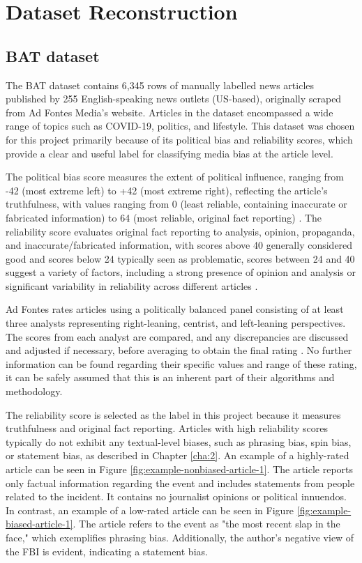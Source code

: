 \chapter{Dataset Reconstruction}
\label{cha:3}

\section{BAT dataset} \label{bat-characteristics}

The BAT dataset \cite{spinde-2023-bat} contains 6,345 rows of manually labelled news articles published by 255 English-speaking news outlets (US-based), originally scraped from Ad Fontes Media's website. Articles in the dataset encompassed a wide range of topics such as COVID-19, politics, and lifestyle. This dataset was chosen for this project primarily because of its political bias and reliability scores, which provide a clear and useful label for classifying media bias at the article level.

The political bias score measures the extent of political influence, ranging from -42 (most extreme left) to +42 (most extreme right), reflecting the article's truthfulness, with values ranging from 0 (least reliable, containing inaccurate or fabricated information) to 64 (most reliable, original fact reporting) \cite{adfontes-bias-reliability}. The reliability score evaluates original fact reporting to analysis, opinion, propaganda, and inaccurate/fabricated information, with scores above 40 generally considered good and scores below 24 typically seen as problematic, scores between 24 and 40 suggest a variety of factors, including a strong presence of opinion and analysis or significant variability in reliability across different articles \cite{adfontes-bias-reliability}.

Ad Fontes rates articles using a politically balanced panel consisting of at least three analysts representing right-leaning, centrist, and left-leaning perspectives. The scores from each analyst are compared, and any discrepancies are discussed and adjusted if necessary, before averaging to obtain the final rating \cite{adfontes-methodology}. No further information can be found regarding their specific values and range of these rating, it can be safely assumed that this is an inherent part of their algorithms and methodology.

The reliability score is selected as the label in this project because it measures truthfulness and original fact reporting. Articles with high reliability scores typically do not exhibit any textual-level biases, such as phrasing bias, spin bias, or statement bias, as described in Chapter \ref{cha:2}. An example of a highly-rated article can be seen in Figure \ref{fig:example-nonbiased-article-1}. The article reports only factual information regarding the event and includes statements from people related to the incident. It contains no journalist opinions or political innuendos. In contrast, an example of a low-rated article can be seen in Figure \ref{fig:example-biased-article-1}. The article refers to the event as "the most recent slap in the face," which exemplifies phrasing bias. Additionally, the author's negative view of the FBI is evident, indicating a statement bias.

